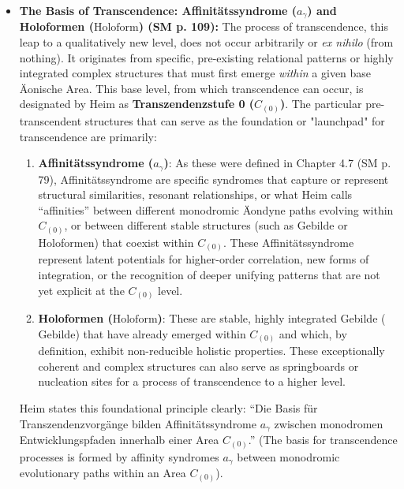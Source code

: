 \documentclass[12pt]{article}
\newcommand{\q}[1]{\enquote{#1}}
\newcommand{\conceptualsyndrome}{a} %
\newcommand{\syntrometrischesGebilde}{\text{Gebilde}}
\newcommand{\holoform}{\text{Holoform}}
\begin{document}
\begin{itemize}
    \item \textbf{The Basis of Transcendence: Affinitätssyndrome (\(\conceptualsyndrome_\gamma\)) and Holoformen (\(\holoform\)) (SM p. 109):}
    The process of transcendence, this leap to a qualitatively new level, does not occur arbitrarily or \textit{ex nihilo} (from nothing). It originates from specific, pre-existing relational patterns or highly integrated complex structures that must first emerge \textit{within} a given base Äonische Area. This base level, from which transcendence can occur, is designated by Heim as \textbf{Transzendenzstufe 0 (\( C_{(0)} \))}. The particular pre-transcendent structures that can serve as the foundation or "launchpad" for transcendence are primarily:
    \begin{enumerate}
        \item \textbf{Affinitätssyndrome (\( a_\gamma \))}: As these were defined in Chapter 4.7 (SM p. 79), Affinitätssyndrome are specific syndromes that capture or represent structural similarities, resonant relationships, or what Heim calls \q{affinities} between different monodromic Äondyne paths evolving within \( C_{(0)} \), or between different stable structures (such as Gebilde or Holoformen) that coexist within \( C_{(0)} \). These Affinitätssyndrome represent latent potentials for higher-order correlation, new forms of integration, or the recognition of deeper unifying patterns that are not yet explicit at the \( C_{(0)} \) level.
        \item \textbf{Holoformen (\(\holoform\))}: These are stable, highly integrated Gebilde (\(\syntrometrischesGebilde\)) that have already emerged within \( C_{(0)} \) and which, by definition, exhibit non-reducible holistic properties. These exceptionally coherent and complex structures can also serve as springboards or nucleation sites for a process of transcendence to a higher level.
    \end{enumerate}
    Heim states this foundational principle clearly: \q{Die Basis für Transzendenzvorgänge bilden Affinitätssyndrome \( a_\gamma \) zwischen monodromen Entwicklungspfaden innerhalb einer Area \( C_{(0)} \).} (The basis for transcendence processes is formed by affinity syndromes \( a_\gamma \) between monodromic evolutionary paths within an Area \( C_{(0)} \)).


\end{itemize}
\end{document}
